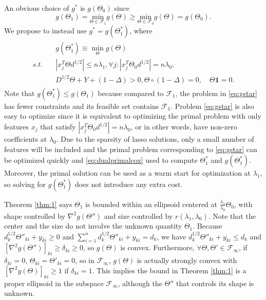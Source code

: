 An obvious choice of $g^*$ is $g(\Theta_{0})$ since
\begin{equation*}
  g(\Theta_{1}) = \underset{\Theta\in \mathcal{F}_{1}}{\mathrm{min}}g(\Theta)\geq\underset{\Theta\in \mathcal{F}_{0}}{\mathrm{min}}g(\Theta) = g\left(\Theta_{0}\right).
\end{equation*}
We propose to instead use $g^* = g(\Theta^*_{1})$, where
\begin{gather}
    \label{eq:gstar}
    \begin{aligned}
        &g(\Theta^*_{1}) \equiv \min_\Theta g(\Theta)\\
        s.t.\quad &|x_j^T\Theta d^{1/2}|\leq n\lambda_1,\forall j:|x_j^T\Theta_{0} d^{1/2}|= n\lambda_0,\\&D^{1/2}\Theta+Y+(1-\Delta)> 0, \Theta\circ(1-\Delta)=0,\quad \Theta\mathbf{1}=0.
    \end{aligned}
\end{gather}
Note that $g(\Theta^*_{1}) \leq g(\Theta_{1})$ because compared to $\mathcal{F}_{1}$, the problem in \eqref{eq:gstar} has fewer constraints and its feasible set contains $\mathcal{F}_{1}$. Problem \eqref{eq:gstar} is also easy to optimize since it is equivalent to optimizing the primal problem with only features $x_j$ that satisfy $|x_j^T\Theta_{0} d^{1/2}|= n\lambda_0$, or in other words, have non-zero coefficients at $\lambda_0$. Due to the sparsity of lasso solutions, only a small number of features will be included and the primal problem corresponding to \eqref{eq:gstar} can be optimized quickly and \eqref{eq:dualprimalcox} used to compute $\Theta_1^*$ and $g(\Theta_1^*)$. Moreover, the primal solution can be used as a warm start for optimization at $\lambda_1$, so solving for $g(\Theta^*_{1})$ does not introduce any extra cost.

Theorem \ref{thm:1} says $\Theta_{1}$ is bounded within an ellipsoid centered at $\frac{\lambda_1}{\lambda_0}\Theta_{0}$, with shape controlled by $\nabla^2g(\Theta'')$ and size controlled by $r(\lambda_1,\lambda_0)$. Note that the center and the size do not involve the unknown quantity $\Theta_{1}$. Because $d_k^{1/2}\Theta''_{ki}+y_{ki}\geq 0$ and $\sum_{i=1}^nd_k^{1/2}\Theta''_{ki}+y_{ki}=d_k$, we have $d_k^{1/2}\Theta''_{ki}+y_{ki}\leq d_k$ and $[\nabla^2 g(\Theta'')]_{ki}\geq\delta_{ki}\geq 0$, so $g(\Theta)$ is convex. Furthermore, $\forall\Theta,\Theta'\in\mathcal{F}_{\infty}$, if $\delta_{ki}=0$, $\Theta_{ki}=\Theta'_{ki}=0$, so in $\mathcal{F}_{\infty}$, $g(\Theta)$ is actually strongly convex with $[\nabla^2 g(\Theta)]_{ki}\geq 1$ if $\delta_{ki}=1$. This implies the bound in Theorem \ref{thm:1} is a proper ellipsoid in the subspace $\mathcal{F}_{\infty}$, although the $\Theta''$ that controls its shape is unknown.

